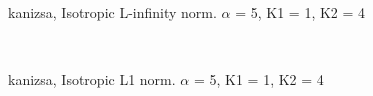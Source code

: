 \begin{figure}
  \centering
     \\
  \caption{kanizsa, Isotropic L-infinity norm. $\alpha$ = 5, K1 = 1, K2 = 4}
  \label{fig:kanizsa_LINF_a5_k11_k24}
\end{figure}

\begin{figure}
  \centering
     \\
  \caption{kanizsa, Isotropic L1 norm. $\alpha$ = 5, K1 = 1, K2 = 4}
  \label{fig:kanizsa_L1_a5_k11_k24}
\end{figure}

